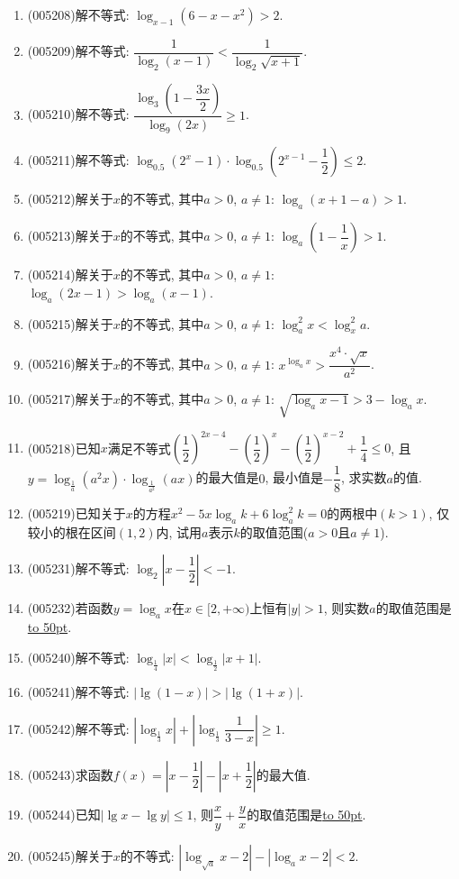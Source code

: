 \documentclass[10pt,a4paper]{article}
\newcommand{\blank}[1]{\underline{\hbox to #1pt{}}}
\begin{document}
\begin{enumerate}[1.]
\item {\tiny (005208)}解不等式: $\log_{x-1}(6-x-x^2)>2$.
\item {\tiny (005209)}解不等式: $\dfrac 1{\log_2(x-1)}<\dfrac 1{\log_2\sqrt{x+1}}$.
\item {\tiny (005210)}解不等式: $\dfrac{\log_3(1-\dfrac{3x}2)}{\log_9(2x)}\ge 1$.
\item {\tiny (005211)}解不等式: $\log_{0.5}({2^x}-1)\cdot \log_{0.5}({2^{x-1}}-\dfrac 12)\le 2$.
\item {\tiny (005212)}解关于$x$的不等式, 其中$a>0$, $a\ne 1$: $\log_a(x+1-a)>1$.
\item {\tiny (005213)}解关于$x$的不等式, 其中$a>0$, $a\ne 1$: $\log_a(1-\dfrac 1x)>1$.
\item {\tiny (005214)}解关于$x$的不等式, 其中$a>0$, $a\ne 1$: $\log_a(2x-1)>\log_a(x-1)$.
\item {\tiny (005215)}解关于$x$的不等式, 其中$a>0$, $a\ne 1$: $\log_a^2x<\log_x^2a$.
\item {\tiny (005216)}解关于$x$的不等式, 其中$a>0$, $a\ne 1$: ${x^{\log_ax}}>\dfrac{x^4\cdot \sqrt x}{a^2}$.
\item {\tiny (005217)}解关于$x$的不等式, 其中$a>0$, $a\ne 1$: $\sqrt{\log_ax-1}>3-\log_ax$.
\item {\tiny (005218)}已知$x$满足不等式$(\dfrac 12)^{2x-4}-(\dfrac 12)^x-(\dfrac 12)^{x-2}+\dfrac 14\le 0$, 且$y=\log_{\frac 1a}(a^2x)\cdot \log_{\frac 1{a^2}}(ax)$的最大值是$0$, 最小值是$-\dfrac 18$, 求实数$a$的值.
\item {\tiny (005219)}已知关于$x$的方程$x^2-5x\log_ak+6\log _a^2k=0$的两根中$(k>1)$, 仅较小的根在区间$(1,2)$内, 试用$a$表示$k$的取值范围($a>0$且$a\ne 1$).
\item {\tiny (005231)}解不等式: $\log_2|x-\dfrac 12|<-1$.
\item {\tiny (005232)}若函数$y=\log_ax$在$x\in [2,+\infty)$上恒有$|y|>1$, 则实数$a$的取值范围是\blank{50}.
\item {\tiny (005240)}解不等式: $\log_{\frac 14}|x|<\log_{\frac 12}|x+1|$.
\item {\tiny (005241)}解不等式: $|\lg (1-x)|>|\lg (1+x)|$.
\item {\tiny (005242)}解不等式: $|\log_{\frac 13}x|+|\log_{\frac 13}\dfrac 1{3-x}|\ge 1$.
\item {\tiny (005243)}求函数$f(x)=|x-\dfrac 12|-|x+\dfrac 12|$的最大值.
\item {\tiny (005244)}已知$|\lg x-\lg y|\le 1$, 则$\dfrac xy+\dfrac yx$的取值范围是\blank{50}.
\item {\tiny (005245)}解关于$x$的不等式: $|\log_{\sqrt a}x-2|-|\log_ax-2|<2$.

\end{enumerate}
\end{document}
